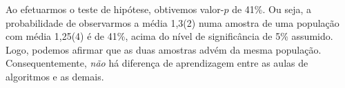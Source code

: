 Ao efetuarmos o teste de hipótese, obtivemos valor-$p$ de 41\%.
Ou seja, a probabilidade de observarmos a média 1,3(2) numa amostra de uma população com média 1,25(4) é de 41\%, acima do nível de significância de 5\% assumido.
Logo, podemos afirmar que as duas amostras advém da mesma população.
Consequentemente, \emph{não} há diferença de aprendizagem entre as aulas de algoritmos e as demais.